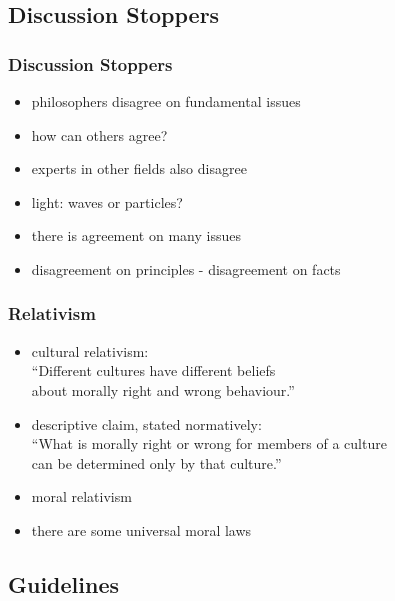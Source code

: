 \documentclass[dvipsnames]{beamer}
\theoremstyle{plain}
\begin{document}
\subsection{Discussion Stoppers}

\begin{frame}
  \frametitle{Discussion Stoppers}

  \begin{itemize}
    \item philosophers disagree on fundamental issues
    \item how can others agree?

    \pause
    \bigskip
    \item experts in other fields also disagree
    \item light: waves or particles?

    \pause
    \medskip
    \item there is agreement on many issues

    \pause
    \medskip
    \item disagreement on principles - disagreement on facts
  \end{itemize}
\end{frame}

\begin{frame}
  \frametitle{Relativism}

  \begin{itemize}
    \item cultural relativism:\\
      ``Different cultures have different beliefs\\
      about morally right and wrong behaviour.''

    \pause
    \medskip
    \item descriptive claim, stated normatively:\\
      ``What is morally right or wrong for members of a culture\\
      can be determined only by that culture.''
    \item moral relativism

    \pause
    \medskip
    \item there are some universal moral laws
  \end{itemize}
\end{frame}

\subsection{Guidelines}
\end{document}
